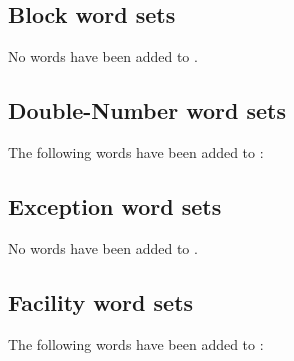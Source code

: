 \subsection{Block word sets}
No words have been added to .

\subsection{Double-Number word sets}
The following words have been added to :


\subsection{Exception word sets}
No words have been added to .

\subsection{Facility word sets}
The following words have been added to :

